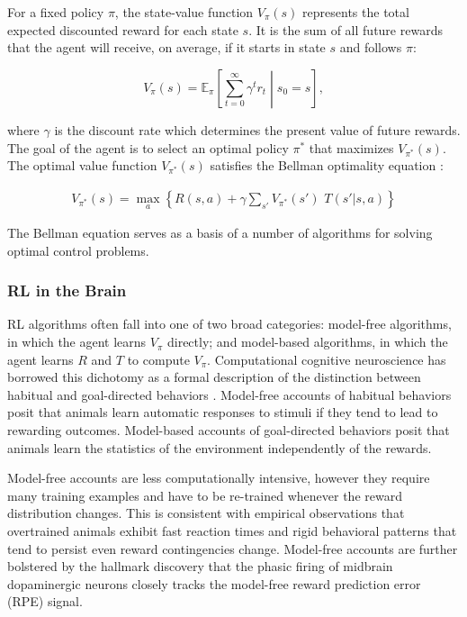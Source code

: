 \documentclass[11pt]{article}
\begin{document}
For a fixed policy $\pi$, the state-value function $V_\pi(s)$ represents the total expected discounted reward for each state $s$. It is the sum of all future rewards that the agent will receive, on average, if it starts in state $s$ and follows $\pi$:

\[
V_{\pi}(s) = \mathbb{E}_{\pi} \left[  \sum_{t=0}^{\infty} \gamma^{t} r_t \middle| s_0 = s \right] ,
\]

where $\gamma$ is the discount rate which determines the present value of future rewards. The goal of the agent is to select an optimal policy $\pi^*$ that maximizes $V_{\pi^*}(s)$. The optimal value function $V_{\pi^*}(s)$ satisfies the Bellman optimality equation \cite{Bellman1957}:

\begin{align*}
V_{\pi^*}(s) = \max_a  \left\{ R(s,a) + \gamma \sum_{s'} V_{\pi^*}(s') \,\, T(s'|s,a) \right\} 
\end{align*}

The Bellman equation serves as a basis of a number of algorithms for solving optimal control problems.

\subsubsection{RL in the Brain}

RL algorithms often fall into one of two broad categories: model-free algorithms, in which the agent learns $V_\pi$ directly; and model-based algorithms, in which the agent learns $R$ and $T$ to compute $V_\pi$.  Computational cognitive neuroscience has borrowed this dichotomy as a formal description of the distinction between habitual and goal-directed behaviors \cite{Dolan2013}. Model-free accounts of habitual behaviors posit that animals learn automatic responses to stimuli if they tend to lead to rewarding outcomes. Model-based accounts of goal-directed behaviors posit that animals learn the statistics of the environment independently of the rewards.

Model-free accounts are less computationally intensive, however they require many training examples and have to be re-trained whenever the reward distribution changes. This is consistent with empirical observations that overtrained animals exhibit fast reaction times and rigid behavioral patterns that tend to persist even reward contingencies change. Model-free accounts are further bolstered by the hallmark discovery that the phasic firing of midbrain dopaminergic neurons closely tracks the model-free reward prediction error (RPE) signal.
\end{document}
